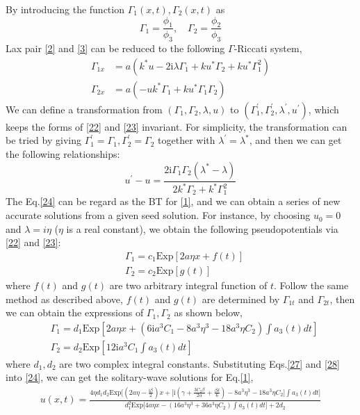 \documentclass[12pt]{article}
\begin{document}
By introducing the function $\Gamma_{1}(x,t), \Gamma_{2}(x,t)$ as
\begin{equation}
  \Gamma_{1} = \frac{\phi_{1}}{\phi_{3}}, \quad \Gamma_{2} = \frac{\phi_{2}}{\phi_{3}}
\end{equation}
Lax pair \eqref{2} and \eqref{3} can be reduced to the following $\Gamma$-Riccati system,
\begin{align}
  \Gamma_{1x} &= a(k^{*}u - 2\mathrm{i}\lambda \Gamma_{1} + ku^{*}\Gamma_{2} + ku^{*}\Gamma_{1}^{2}) \label{22} \\
  \Gamma_{2x} &= a(-uk^{*}\Gamma_{1} + ku^{*}\Gamma_{1}\Gamma_{2})  \label{23}
\end{align}
We can define a transformation from $(\Gamma_{1}, \Gamma_{2}, \lambda, u)$ to $(\Gamma_{1}^{'}, \Gamma_{2}^{'}, \lambda^{'}, u^{'})$, which keeps the forms of \eqref{22} and \eqref{23} invariant. For simplicity, the transformation can be tried by giving $\Gamma_{1}^{'} = \Gamma_{1}, \Gamma_{2}^{'} = \Gamma_{2}$ together with $\lambda^{'} = \lambda^{*}$, and then we can get the following relationships:
\begin{equation}
  u^{'} - u = \frac{2\mathrm{i}\Gamma_{1}\Gamma_{2}(\lambda^{*}-\lambda)}{2k^{*}\Gamma_{2} + k^{*}\Gamma_{1}^{2}} \label{24}
\end{equation}
The Eq.\eqref{24} can be regard as the BT for \eqref{1}, and we can obtain a series of new accurate solutions from a given seed solution. For instance, by choosing $u_{0} = 0$ and $\lambda = i\eta$ ($\eta$ is a real constant), we obtain the following pseudopotentials via \eqref{22} and \eqref{23}:
\begin{align}
  & \Gamma_{1} = c_{1}\mathrm{Exp}[2a\eta x + f(t)] \\
  & \Gamma_{2} = c_{2}\mathrm{Exp}[g(t)]
\end{align}
where $f(t)$ and $g(t)$ are two arbitrary integral function of $t$. Follow the same method as described above, $f(t)$ and $g(t)$ are determined by $\Gamma_{1t}$ and $\Gamma_{2t}$, then we can obtain the expressions of $\Gamma_{1}, \Gamma_{2}$ as shown below,
\begin{align}
  & \Gamma_{1} = d_{1}\mathrm{Exp}\left[2a\eta x + (6\mathrm{i}a^{3}C_{1} - 8a^{3}\eta^{3} - 18a^{3}\eta C_{2})\int a_{3}(t)dt\right] \label{27}\\
  & \Gamma_{2} = d_{2}\mathrm{Exp}\left[12\mathrm{i}a^{3}C_{1}\int a_{3}(t)dt\right] \label{28}
\end{align}
where $d_{1}, d_{2}$ are two complex integral constants. Substituting Eqs.\eqref{27} and \eqref{28} into \eqref{24}, we can get the solitary-wave solutions for Eq.\eqref{1},
\begin{align}
  u(x,t) = \frac{4\eta d_{1}d_{2}\mathrm{Exp} \Big[(2a\eta - \frac{\mathrm{i}\beta}{2})x + \Big[\mathrm{i}(\gamma + \frac{3C_{2}\beta}{2\alpha} + \frac{\beta\delta}{6}) - 8a^{3}\eta^{3}- 18a^{3}\eta C_{2}\Big]\int a_{3}(t)dt \Big]}{d_{1}^{2}\mathrm{Exp} \Big[4a\eta x - (16a^{3}\eta^{3} + 36a^{3}\eta C_{2})\int a_{3}(t)dt \Big] + 2d_{2}}
\end{align}
\end{document}
